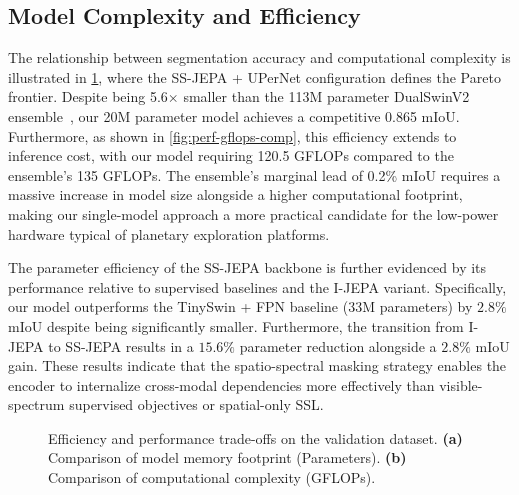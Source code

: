 \subsection{Model Complexity and Efficiency}
\label{sec:model-compl-eff}

The relationship between segmentation accuracy and computational complexity is illustrated in \cref{fig:main_results}, where the SS-JEPA + UPerNet configuration defines the Pareto frontier. Despite being 5.6$\times$ smaller than the 113M parameter DualSwinV2 ensemble~\cite{kabir2026dualswinfusionsegmultimodalmartianlandslide}, our 20M parameter model achieves a competitive 0.865 mIoU. Furthermore, as shown in \cref{fig:perf-gflops-comp}, this efficiency extends to inference cost, with our model requiring 120.5 GFLOPs compared to the ensemble's 135 GFLOPs. The ensemble's marginal lead of 0.2\% mIoU requires a massive increase in model size alongside a higher computational footprint, making our single-model approach a more practical candidate for the low-power hardware typical of planetary exploration platforms.

The parameter efficiency of the SS-JEPA backbone is further evidenced by its performance relative to supervised baselines and the I-JEPA variant. Specifically, our model outperforms the TinySwin + FPN baseline (33M parameters) by $2.8\%$ mIoU despite being significantly smaller. Furthermore, the transition from I-JEPA to SS-JEPA results in a $15.6\%$ parameter reduction alongside a $2.8\%$ mIoU gain. These results indicate that the spatio-spectral masking strategy enables the encoder to internalize cross-modal dependencies more effectively than visible-spectrum supervised objectives or spatial-only SSL.

\begin{figure}
	\centering

	\hfill

	\caption{Efficiency and performance trade-offs on the validation dataset. \textbf{(a)} Comparison of model memory footprint (Parameters). \textbf{(b)} Comparison of computational complexity (GFLOPs).}
	\label{fig:main_results}
\end{figure}
